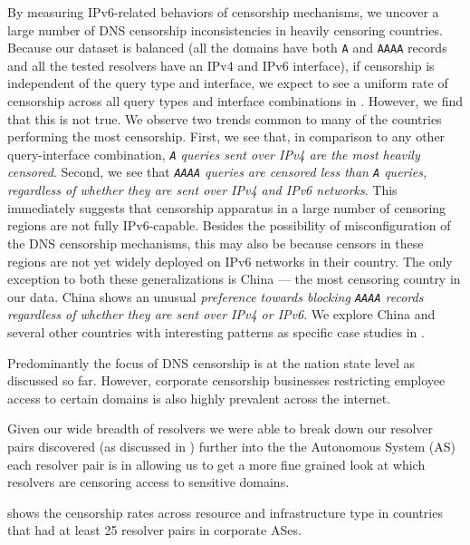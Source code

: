 By measuring IPv6-related behaviors of censorship mechanisms, we uncover
a large number of DNS censorship inconsistencies in heavily censoring
countries.
%
Because our dataset is balanced (\ie all the domains have both {\tt A} and
{\tt AAAA} records and all the tested resolvers have an IPv4 and IPv6
interface), if censorship is independent of the query type and interface, we
expect to see a uniform rate of censorship across all query types and interface
combinations in . 
%
However, we find that this is not true. We observe two trends common to many of
the countries performing the most censorship. 
%
First, we see that, in comparison to any other query-interface combination,
{\em {\tt A} queries sent over IPv4 are the most heavily censored}. Second, we
see that {\em{\tt AAAA} queries are censored less than {\tt A} queries,
regardless of whether they are sent over IPv4 and IPv6 networks}.
%
This immediately suggests that censorship apparatus in a large number of
censoring regions are not fully IPv6-capable. Besides the possibility of
misconfiguration of the DNS censorship mechanisms, this may also be because
censors in these regions are not yet widely deployed on IPv6 networks in their
country.
%
The only exception to both these generalizations is China --- the most
censoring country in our data. China shows an unusual {\em preference towards
blocking {\tt AAAA} records regardless of whether they are sent over IPv4 or
IPv6}. We explore China and several other countries with
interesting patterns as specific case studies in .

Predominantly the focus of DNS censorship is at the nation state level as
discussed so far. However, corporate censorship \ie businesses restricting
employee access to certain domains is also highly prevalent across the internet.

Given our wide breadth of resolvers we were able to break down our resolver
pairs discovered (as discussed in ) further into
the the Autonomous System (AS) each resolver pair is in allowing us to get a
more fine grained look at which resolvers are censoring access to sensitive
domains.

\SmallCountriesCorporate

 shows the censorship rates across resource
and infrastructure type in countries that had at least 25 resolver pairs in
corporate ASes.

